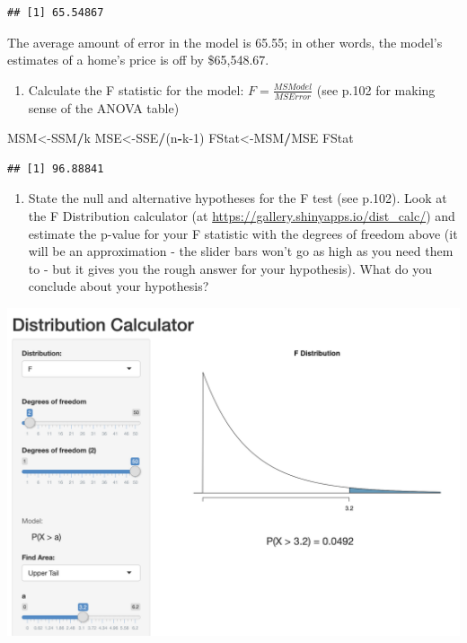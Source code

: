 \documentclass[]{article}
\newenvironment{Shaded}{\begin{snugshade}}{\end{snugshade}}
\newcommand{\DecValTok}[1]{\textcolor[rgb]{0.00,0.00,0.81}{#1}}
\newcommand{\NormalTok}[1]{#1}
\newcommand{\OperatorTok}[1]{\textcolor[rgb]{0.81,0.36,0.00}{\textbf{#1}}}
\providecommand{\tightlist}{%
  \setlength{\itemsep}{0pt}\setlength{\parskip}{0pt}}
\begin{document}
\begin{verbatim}
## [1] 65.54867
\end{verbatim}

The average amount of error in the model is 65.55; in other words, the
model's estimates of a home's price is off by \$65,548.67.

\begin{enumerate}
\def\labelenumi{\arabic{enumi}.}
\tightlist
\item
  Calculate the F statistic for the model:
  \(F = \frac{MSModel}{MSError}\) (see p.102 for making sense of the
  ANOVA table)
\end{enumerate}

\begin{Shaded}
\begin{Highlighting}[]
\NormalTok{MSM<-SSM}\OperatorTok{/}\NormalTok{k}
\NormalTok{MSE<-SSE}\OperatorTok{/}\NormalTok{(n}\OperatorTok{-}\NormalTok{k}\DecValTok{-1}\NormalTok{)}
\NormalTok{FStat<-MSM}\OperatorTok{/}\NormalTok{MSE}
\NormalTok{FStat}
\end{Highlighting}
\end{Shaded}

\begin{verbatim}
## [1] 96.88841
\end{verbatim}

\begin{enumerate}
\def\labelenumi{\arabic{enumi}.}
\tightlist
\item
  State the null and alternative hypotheses for the F test (see p.102).
  Look at the F Distribution calculator (at
  \url{https://gallery.shinyapps.io/dist_calc/}) and estimate the
  p-value for your F statistic with the degrees of freedom above (it
  will be an approximation - the slider bars won't go as high as you
  need them to - but it gives you the rough answer for your hypothesis).
  What do you conclude about your hypothesis?
\end{enumerate}

\includegraphics{FStatistic.png}
\end{document}
